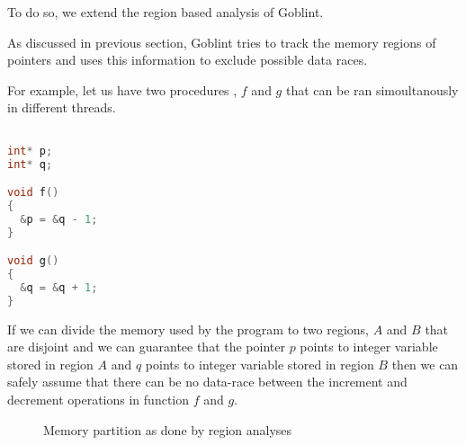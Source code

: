 \documentclass[..thesis.tex]{subfiles}
\begin{document}
To do so, we extend the region based analysis of Goblint.


As discussed in previous section, Goblint tries to track the memory regions of pointers and uses this information to exclude possible data races.


For example, let us have two procedures , $f$ and $g$ that can be ran simoultanously in different threads.

\begin{lstlisting}[language=c,style=def]

int* p;
int* q;

void f()
{
  &p = &q - 1; 
}

void g()
{
  &q = &q + 1; 
}

\end{lstlisting}

 

 If we can divide the memory used by the program to two regions, $A$ and $B$ that are disjoint and we can guarantee that the pointer $p$ points to integer variable stored in region $A$ and $q$ points to integer variable stored in region $B$ then we can safely assume that there can be no data-race between the increment and decrement operations in function $f$ and $g$.

\begin{figure}[H]
  \centering
    \caption{Memory partition as done by region analyses}
\end{figure}
\end{document}
